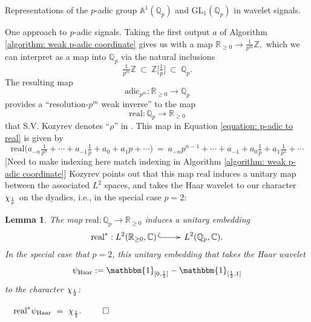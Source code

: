 \documentclass[letterpaper,11pt, reqno]{amsart}
\makeatletter
\newtheorem{monodromy theorem}{Monodromy Theorem}[subsection]
\newtheorem{wild conjecture}[theorem]{Wild Conjecture}
\newtheorem{lemma}[theorem]{Lemma}
\newtheorem{research objectives}{Research objectives}[subsection]
\newtheorem{research question}[theorem]{Research questions}
\newtheorem{aside question}[theorem]{Aside question}
\newtheorem{audio example}[theorem]{\loudspeaker[3] Example}
\newtheorem{blank remark}[theorem]{}
\newtheorem{terminology and comment}[theorem]{Terminology and comment}
\newtheorem{purity hypothesis}[theorem]{Purity hypothesis}
\newtheorem{corollary of the purity hypothesis}[theorem]{Corollary of the purity hypothesis}
\newcommand{\CC} {{\mathbb C}}
\newcommand{\QQ} {{\mathbb Q}}
\newcommand{\RR} {{\mathbb R}}
\newcommand{\ZZ} {{\mathbb Z}}
\newcommand{\mono}{\!\xymatrix{{}\ar@{^{(}->}[r]&{}}\!}
\numberwithin{equation}{theorem}
\makeatother
\begin{document}
\begin{section}{Representations of the $p$-adic group $\mathbb{A}^{\!1}(\mathbb{Q}_{p})$
and $\text{GL}_{1}(\mathbb{Q}_{p})$
in wavelet signals.}
\begin{subsection}{One approach to {\em p}-adic signals.}
Taking the first output $a$ of Algorithm \ref{algorithm: weak p-adic coordinate} gives us with a map
	$
	\RR_{\ge0}\longrightarrow\tfrac{1}{p^m}\ZZ,
	$
which we can interpret as a map into $\QQ_{p}$ via the natural inclusions
	$$
	\tfrac{1}{p^m}\ZZ
	\ \subset\ 
	\ZZ\big[\tfrac{1}{p}\big]
	\ \subset\ 
	\QQ_{p}.
	$$
The resulting map
	\begin{equation}\label{equation: weak inverse from algorithm}
	\text{adic}_{p^m}:\RR_{\ge0}\longrightarrow\QQ_p
	\end{equation}
provides a ``resolution-$p^{m}$ weak inverse'' to the map
	\begin{equation}\label{equation: p-adic to real}
	\text{real}:\QQ_{p}\longrightarrow\RR_{\ge0}
	\end{equation}
that S.V. Kozyrev denotes ``$\rho$'' in \cite[p. 7, Equation (12)]{Kozyrev}. This map in Equation \eqref{equation: p-adic to real} is given by
	$$
	\text{real}\big(a_{-n}\tfrac{1}{p^{n}}+\cdots+a_{-1}\tfrac{1}{p}+a_0+a_1 p+\cdots\big)
	\ =\ 
	a_{-n}p^{n-1}+\cdots+a_{-1}+a_0\tfrac{1}{p}+a_1\tfrac{1}{p^{2}}+\cdots
	$$
{\color{red} [Need to make indexing here match indexing in Algorithm \ref{algorithm: weak p-adic coordinate}]}
Kozyrev points out that this map $\text{real}$ induces a unitary map between the associated $L^2$ spaces, and takes the Haar wavelet to our character $\chi_{\text{{\smaller\smaller\smaller $\tfrac{1}{p}$}}}$ on the dyadics, i.e., in the special case $p=2$:

\begin{lemma}\label{lemma: Kozyrev}
\normalfont
\cite[Lemmas 5 \& 6]{Kozyrev}
The map $\text{real}:\QQ_{p}\longrightarrow\RR_{\ge0}$ induces a unitary embedding
	$$
	\text{real}^\ast:L^2(\RR_{\ge0},\CC)\mono L^2(\QQ_{p},\CC).
	$$
In the special case that $p=2$, this unitary embedding
that takes the Haar wavelet $$\psi_{\text{Haar}}:=\mathbbm{1}_{[0,\text{{\smaller\smaller\smaller $\tfrac{1}{2}$}}]}-\mathbbm{1}_{[\text{{\smaller\smaller\smaller $\tfrac{1}{2}$}},1]}$$ to the character $\chi_{\text{{\smaller\smaller\smaller $\tfrac{1}{2}$}}}$:

\hfill \ \ $
	\text{real}^\ast\psi_{\text{Haar}}
	\ =\ 
	\chi_{\text{{\smaller\smaller\smaller $\tfrac{1}{2}$}}}.
 	$
\hfill $\qed$
\end{lemma}


\end{subsection}
\end{section}
\end{document}
